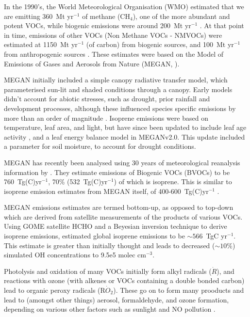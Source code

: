     In the 1990's, the World Meteorological Organisation (WMO) estimated that we are emitting 360~Mt yr$^{-1}$ of methane (CH$_4$), one of the more abundant and potent VOCs, while biogenic emissions were around 200~Mt yr$^{-1}$ \citep{Atkinson2000}.
    At that point in time, emissions of other VOCs (Non Methane VOCs - NMVOCs) were estimated at 1150~Mt yr$^{-1}$ (of carbon) from biogenic sources, and 100~Mt yr$^{-1}$ from anthropogenic sources \citep{Guenther1995, Atkinson2000}.
    These estimates were based on the Model of Emissions of Gases and Aerosols from Nature (MEGAN, \citet{Guenther1995}).
    
    MEGAN initially included a simple canopy radiative transfer model, which parameterised sun-lit and shaded conditions through a canopy.
    Early models didn't account for abiotic stresses, such as drought, prior rainfall and development processes, although these influenced species specific emissions by more than an order of magnitude \citep{Niinemets2000}.
    Isoprene emissions were based on temperature, leaf area, and light, but have since been updated to include leaf age activity \citep{Guenther1999}, and a leaf energy balance model \citep{Guenther2006} in MEGANv2.0.
    This update included a parameter for soil moisture, to account for drought conditions.
    
    MEGAN has recently been analysed using 30 years of meteorological reanalysis information by \citet{Sindelarova2014}.
    They estimate emissions of Biogenic VOCs (BVOCs) to be 760~Tg(C)yr$^{-1}$, 70\% (532~Tg(C)yr$^{-1}$) of which is isoprene.
    This is similar to isoprene emission estimates from MEGAN itself, of 400-600~Tg(C)yr$^{-1}$ \citep{Guenther2006}.
    
    MEGAN emissions estimates are termed bottom-up, as opposed to top-down which are derived from satellite measurements of the products of various VOCs.
    Using GOME satellite HCHO and a Beyesian inversion technique to derive isoprene emissions, \citet{Shim2005} estimated global isoprene emissions to be $\sim566$~TgC yr$^{-1}$. 
    This estimate is greater than initially thought and leads to decreased ($\sim10\%$) simulated OH concentrations to 9.5e5 molec cm$^{-3}$.
    
    Photolysis and oxidation of many VOCs initially form alkyl radicals ($\dot{R}$), and reactions with ozone (with alkenes or VOCs containing a double bonded carbon) lead to organic peroxy radicals (R$\dot{O}_2$). 
    These go on to form many prooducts and lead to (amongst other things) aerosol, formaldehyde, and ozone formation, depending on various other factors such as sunlight and NO pollution \citep{Atkinson2000}.
    
